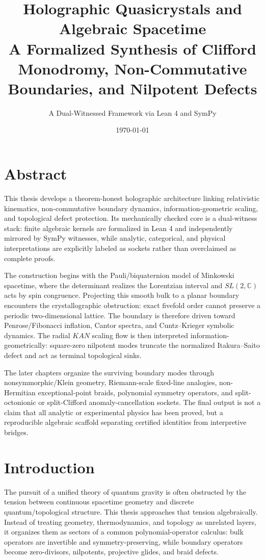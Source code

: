 \documentclass[12pt,a4paper]{book}
\title{\textbf{Holographic Quasicrystals and Algebraic Spacetime}\\
\Large A Formalized Synthesis of Clifford Monodromy, Non-Commutative Boundaries, and Nilpotent Defects}
\author{A Dual-Witnessed Framework via Lean 4 and SymPy}
\date{\today}
\begin{document}
\maketitle

\chapter*{Abstract}
This thesis develops a theorem-honest holographic architecture linking relativistic kinematics, non-commutative boundary dynamics, information-geometric scaling, and topological defect protection.  Its mechanically checked core is a dual-witness stack: finite algebraic kernels are formalized in Lean 4 and independently mirrored by SymPy witnesses, while analytic, categorical, and physical interpretations are explicitly labeled as sockets rather than overclaimed as complete proofs.

The construction begins with the Pauli/biquaternion model of Minkowski spacetime, where the determinant realizes the Lorentzian interval and $SL(2,\mathbb{C})$ acts by spin congruence.  Projecting this smooth bulk to a planar boundary encounters the crystallographic obstruction: exact fivefold order cannot preserve a periodic two-dimensional lattice.  The boundary is therefore driven toward Penrose/Fibonacci inflation, Cantor spectra, and Cuntz--Krieger symbolic dynamics.  The radial $KAN$ scaling flow is then interpreted information-geometrically: square-zero nilpotent modes truncate the normalized Itakura--Saito defect and act as terminal topological sinks.

The later chapters organize the surviving boundary modes through nonsymmorphic/Klein geometry, Riemann-scale fixed-line analogies, non-Hermitian exceptional-point braids, polynomial symmetry operators, and split-octonionic or split-Clifford anomaly-cancellation sockets.  The final output is not a claim that all analytic or experimental physics has been proved, but a reproducible algebraic scaffold separating certified identities from interpretive bridges.

\chapter*{Introduction}

The pursuit of a unified theory of quantum gravity is often obstructed by the tension between continuous spacetime geometry and discrete quantum/topological structure.  This thesis approaches that tension algebraically.  Instead of treating geometry, thermodynamics, and topology as unrelated layers, it organizes them as sectors of a common polynomial-operator calculus: bulk operators are invertible and symmetry-preserving, while boundary operators become zero-divisors, nilpotents, projective glides, and braid defects.
\end{document}
